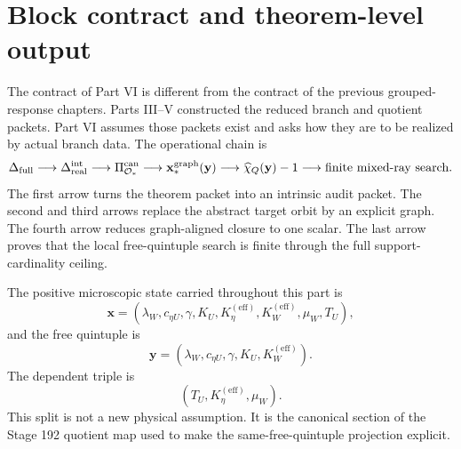 
\section{Block contract and theorem-level output}
\label{sec:part06-block-contract}

The contract of Part VI is different from the contract of the previous grouped-response chapters.  Parts III--V constructed the reduced branch and quotient packets.  Part VI assumes those packets exist and asks how they are to be realized by actual branch data.  The operational chain is
\begin{equation}
\label{eq:part06-operational-chain}
\Delta_{\rm full}
\longrightarrow
\Delta_{\rm real}^{\rm int}
\longrightarrow
\Pi_{\mathcal O_*}^{\rm can}
\longrightarrow
\mathbf x_*^{\rm graph}(\mathbf y)
\longrightarrow
\widehat\chi_Q(\mathbf y)-1
\longrightarrow
\text{finite mixed-ray search.}
\end{equation}
The first arrow turns the theorem packet into an intrinsic audit packet.  The second and third arrows replace the abstract target orbit by an explicit graph.  The fourth arrow reduces graph-aligned closure to one scalar.  The last arrow proves that the local free-quintuple search is finite through the full support-cardinality ceiling.

The positive microscopic state carried throughout this part is
\begin{equation}
\label{eq:part06-state-x}
\mathbf x=
\left(
\lambda_W,
 c_{\eta U},
 \gamma,
 K_U,
 K_\eta^{(\mathrm{eff})},
 K_W^{(\mathrm{eff})},
 \mu_W,
 T_U
\right),
\end{equation}
and the free quintuple is
\begin{equation}
\label{eq:part06-free-quintuple}
\mathbf y=
\left(
\lambda_W,
 c_{\eta U},
 \gamma,
 K_U,
 K_W^{(\mathrm{eff})}
\right).
\end{equation}
The dependent triple is
\begin{equation}
\label{eq:part06-dependent-triple}
(T_U,
 K_\eta^{(\mathrm{eff})},
 \mu_W).
\end{equation}
This split is not a new physical assumption.  It is the canonical section of the Stage 192 quotient map used to make the same-free-quintuple projection explicit.

